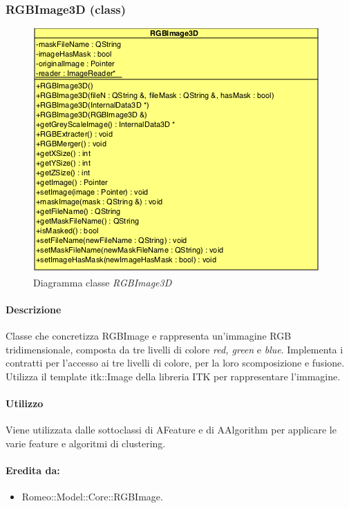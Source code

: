 \subsubsection{RGBImage3D (class)}
\label{RGBImage3D}
\begin{figure}[!h]
\centering
			\includegraphics[scale=1]{./Content/Immagini/modelCore/RGBImage3D.png}
			\caption{Diagramma classe \textsl{RGBImage3D}}
			\label{RGBImage3D_img}
\end{figure}

\paragraph{Descrizione \\}
Classe che concretizza RGBImage e rappresenta un'immagine RGB tridimensionale, composta da tre livelli di colore \textit{red, green} e \textit{blue}. Implementa i contratti per l'accesso ai tre livelli di colore, per la loro scomposizione e fusione.
Utilizza il template itk::Image della libreria ITK\g{} per rappresentare l'immagine.

\paragraph{Utilizzo \\}
Viene utilizzata dalle sottoclassi di AFeature e di AAlgorithm per applicare le varie feature\g{} e algoritmi di clustering\g{}.

\paragraph{Eredita da:}
\begin{itemize}
	\item Romeo::Model::Core::RGBImage.
\end{itemize}


